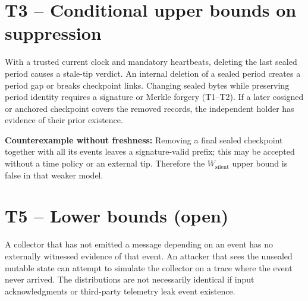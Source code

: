 \section*{T3 -- Conditional upper bounds on suppression}
With a trusted current clock and mandatory heartbeats, deleting the last
sealed period causes a stale-tip verdict. An internal deletion of a sealed
period creates a period gap or breaks checkpoint links. Changing sealed bytes
while preserving period identity requires a signature or Merkle forgery
(T1--T2). If a later cosigned or anchored checkpoint covers the removed
records, the independent holder has evidence of their prior existence.

\textbf{Counterexample without freshness:} Removing a final sealed
checkpoint together with all its events leaves a signature-valid prefix;
this may be accepted without a time policy or an external tip. Therefore the
$W_{\mathrm{silent}}$ upper bound is false in that weaker model.

\section*{T5 -- Lower bounds (open)}
A collector that has not emitted a message depending on an event has no
externally witnessed evidence of that event. An attacker that sees the
unsealed mutable state can attempt to simulate the collector on a trace
where the event never arrived. The distributions are not necessarily
identical if input acknowledgments or third-party telemetry leak event
existence.
